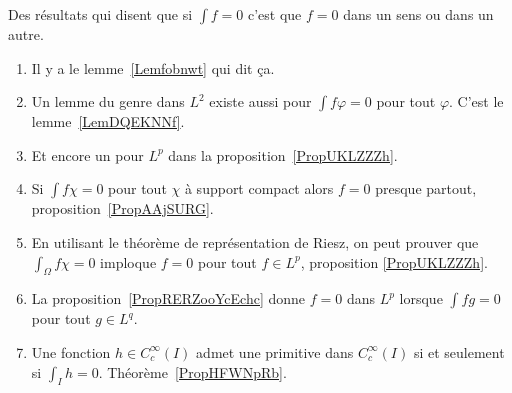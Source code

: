 
Des résultats qui disent que si \( \int f=0\) c'est que \( f=0\) dans un sens ou dans un autre.
\begin{enumerate}
    \item
        Il y a le lemme~\ref{Lemfobnwt} qui dit ça.
    \item
        Un lemme du genre dans \( L^2\) existe aussi pour \( \int f\varphi=0\) pour tout \( \varphi\). C'est le lemme~\ref{LemDQEKNNf}.
    \item
        Et encore un pour \( L^p\) dans la proposition~\ref{PropUKLZZZh}.
    \item
        Si \( \int f\chi=0\) pour tout \( \chi\) à support compact alors \( f=0\) presque partout, proposition~\ref{PropAAjSURG}.
    \item
        En utilisant le théorème de représentation de Riesz, on peut prouver que \( \int_{\Omega}f\chi=0\) imploque \( f=0\) pour tout \( f\in L^p\), proposition \ref{PropUKLZZZh}.
    \item
        La proposition~\ref{PropRERZooYcEchc} donne \( f=0\) dans \( L^p\) lorsque \( \int fg=0\) pour tout \( g\in L^q\).
    \item
        Une fonction \( h\in C^{\infty}_c(I)\) admet une primitive dans \(  C^{\infty}_c(I)\) si et seulement si \( \int_Ih=0\). Théorème~\ref{PropHFWNpRb}.
\end{enumerate}
